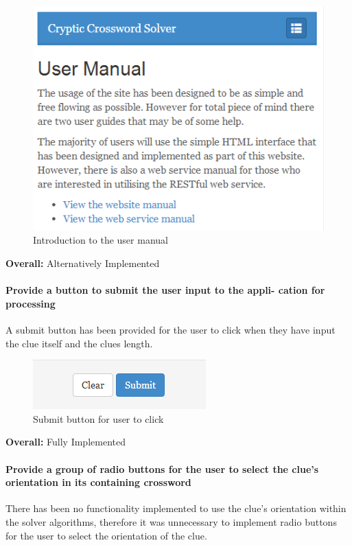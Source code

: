 \begin{figure}[H]
	\centering
	\includegraphics[keepaspectratio=true]{evidence/manual.png}
	\caption{Introduction to the user manual}
\end{figure}

{\bf Overall:} Alternatively Implemented

\paragraph{Provide a button to submit the user input to the appli-
cation for processing}

A submit button has been provided for the user to click when they have input 
the clue itself and the clues length. 

\begin{figure}[H]
	\centering
	\includegraphics[keepaspectratio=true]{evidence/submit.png}
	\caption{Submit button for user to click}
\end{figure}

{\bf Overall:} Fully Implemented

\paragraph{Provide a group of radio buttons for the user to select
the clue's orientation in its containing crossword}

There has been no functionality implemented to use the clue's orientation 
within the solver algorithms, therefore it was unnecessary to implement 
radio buttons for the user to select the orientation of the clue. 

